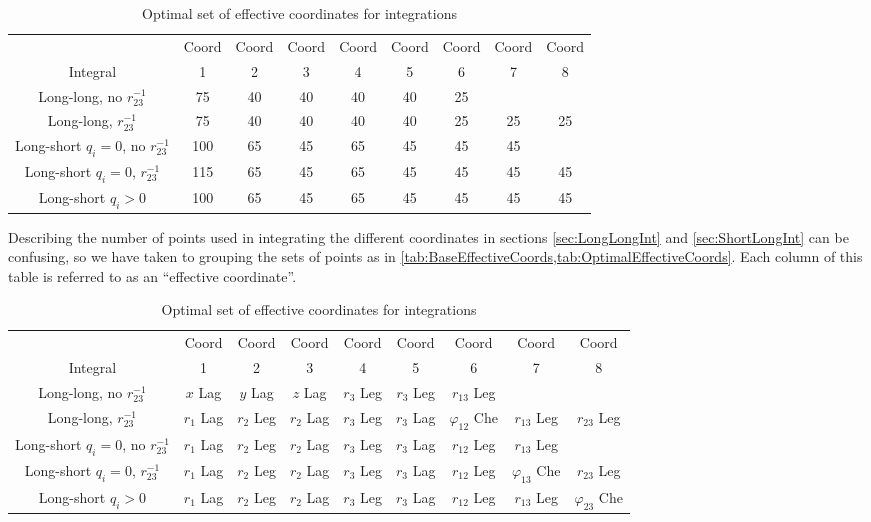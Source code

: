 \documentclass[Dissertation.tex]{subfiles}
\begin{document}
\begin{table}
\centering
\footnotesize
\begin{tabular}{c c c c c c c c c}
\toprule
 & Coord & Coord & Coord & Coord & Coord & Coord & Coord & Coord\\
Integral & 1 & 2 & 3 & 4 & 5 & 6 & 7 & 8 \\
\midrule
 Long-long, no $r_{23}^{-1}$			&  75 & 40 & 40 & 40 & 40 & 25 & & \\
 Long-long, $r_{23}^{-1}$				&  75 & 40 & 40 & 40 & 40 & 25 & 25 & 25 \\
\midrule
 Long-short $q_i = 0$, no $r_{23}^{-1}$	& 100 & 65 & 45 & 65 & 45 & 45 & 45 & \\
 Long-short $q_i = 0$, $r_{23}^{-1}$	& 115 & 65 & 45 & 65 & 45 & 45 & 45 & 45 \\
 Long-short $q_i > 0$					& 100 & 65 & 45 & 65 & 45 & 45 & 45 & 45 \\
\bottomrule
\end{tabular}
\caption{Optimal set of effective coordinates for integrations}
\label{tab:OptimalEffectiveCoords}
\end{table}

Describing the number of points used in integrating the different coordinates 
in sections \ref{sec:LongLongInt} and \ref{sec:ShortLongInt} can be 
confusing, so we have taken to grouping the sets of points as in
\cref{tab:BaseEffectiveCoords,tab:OptimalEffectiveCoords}. Each column of 
this table is referred to as an ``effective coordinate''.

\begin{table}
\centering
\footnotesize
\begin{tabular}{c c c c c c c c c}
\toprule
 & Coord & Coord & Coord & Coord & Coord & Coord & Coord & Coord \\
Integral & 1 & 2 & 3 & 4 & 5 & 6 & 7 & 8 \\
\midrule
 Long-long, no $r_{23}^{-1}$ & $x$ Lag & $y$ Lag & $z$ Lag & $r_3$ Leg & $r_3$ Leg & $r_{13}$ Leg & & \\
 Long-long, $r_{23}^{-1}$ & $r_1$ Lag & $r_2$ Leg & $r_2$ Lag & $r_3$ Leg & $r_3$ Lag & $\varphi_{12}$ Che & $r_{13}$ Leg & $r_{23}$ Leg \\
\midrule
 Long-short $q_i = 0$, no $r_{23}^{-1}$ & $r_1$ Lag & $r_2$ Leg & $r_2$ Lag & $r_3$ Leg & $r_3$ Lag & $r_{12}$ Leg & $r_{13}$ Leg & \\
 Long-short $q_i = 0$, $r_{23}^{-1}$ & $r_1$ Lag & $r_2$ Leg & $r_2$ Lag & $r_3$ Leg & $r_3$ Lag & $r_{12}$ Leg & $\varphi_{13}$ Che & $r_{23}$ Leg \\
 Long-short $q_i > 0$ & $r_1$ Lag & $r_2$ Leg & $r_2$ Lag & $r_3$ Leg & $r_3$ Lag & $r_{12}$ Leg & $r_{13}$ Leg & $\varphi_{23}$ Che \\
\bottomrule
\end{tabular}
\caption{Optimal set of effective coordinates for integrations}
\label{tab:EffectiveCoords}
\end{table}
\end{document}
